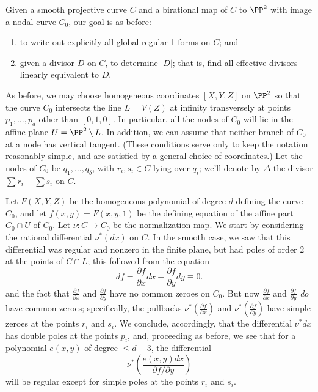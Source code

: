 Given a smooth projective curve $C$ and a birational map of $C$ to $\PP^2$ with image a nodal curve $C_0$, our goal is as before:
\begin{enumerate}
\item to write out explicitly all global regular 1-forms on $C$; and
\item given a divisor $D$ on $C$, to  determine $|D|$; that is, find all effective divisors linearly equivalent to $D$.
\end{enumerate}

As before, we may choose homogeneous coordinates  $[X,Y,Z]$ on $\PP^2$ so that the curve $C_0$ intersects the line $L = V(Z)$ at infinity transversely at points $p_1,\dots,p_d$ other than $[0,1,0]$. In particular,  all the nodes of $C_0$ will lie in the affine plane $U = \PP^2 \setminus L$.
In addition, we can assume that  neither branch of $C_0$ at a node has vertical tangent. (These conditions serve only to keep the notation reasonably simple, and are satisfied by a general choice of coordinates.) Let the nodes of $C_0$ be $q_1,\dots,q_\delta$, with $r_i, s_i \in C$ lying over $q_i$; we'll denote by $\Delta$ the divisor $\sum r_i + \sum s_i$ on $C$.

Let $F(X,Y,Z)$ be the homogeneous polynomial of degree $d$ defining the curve $C_0$, and let $f(x,y) = F(x,y,1)$ be the defining equation of the affine part $C_0 \cap U$ of $C_0$. Let $\nu: C\to C_0$ be the normalization map. We start by considering the rational differential $\nu^*(dx)$ on $C$. In the smooth case, we saw that this differential was regular and nonzero in the finite plane, but had poles of order 2 at the points of $C \cap L$; this followed from the equation
$$
 df = \frac{\partial f}{\partial x}dx + \frac{\partial f}{\partial y}dy \equiv 0.
 $$
and the fact that $\frac{\partial f}{\partial x}$ and $\frac{\partial f}{\partial y}$ have no common zeroes on $C_0$. But now $\frac{\partial f}{\partial x}$ and $\frac{\partial f}{\partial y}$ \emph{do} have common zeroes; specifically, the pullbacks $\nu^*(\frac{\partial f}{\partial x})$ and $\nu^*(\frac{\partial f}{\partial y})$ have simple zeroes at the points $r_i$ and $s_i$. We conclude, accordingly, that the differential $\nu^*dx$ has double poles at the points $p_i$, 
and, proceeding as before, we see that for a polynomial $e(x,y)$ of degree $\leq d-3$, the differential
$$
\nu^*( \frac{e(x,y)dx}{\partial f/\partial y})
$$
will be regular except for simple poles at the points $r_i$ and $s_i$.

